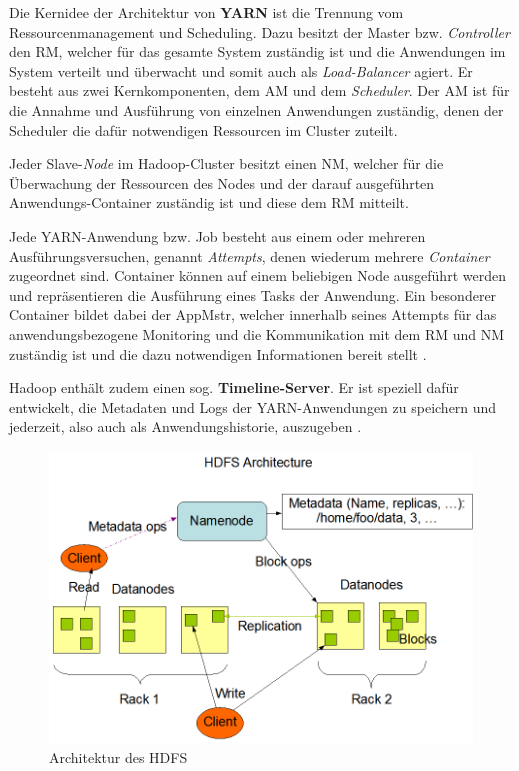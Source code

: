 Die Kernidee der Architektur von \textbf{YARN} ist die Trennung vom Ressourcenmanagement und Scheduling. Dazu besitzt der Master bzw. \emph{Controller} den \ac{RM}, welcher für das gesamte System zuständig ist und die Anwendungen im System verteilt und überwacht und somit auch als \emph{Load-Balancer} agiert. Er besteht aus zwei Kernkomponenten, dem \ac{AM} und dem \emph{Scheduler}. Der \ac{AM} ist für die Annahme und Ausführung von einzelnen Anwendungen zuständig, denen der Scheduler die dafür notwendigen Ressourcen im Cluster zuteilt.

Jeder Slave-\emph{Node} im Hadoop-Cluster besitzt einen \ac{NM}, welcher für die Überwachung der Ressourcen des Nodes und der darauf ausgeführten Anwendungs-Container zuständig ist und diese dem \ac{RM} mitteilt.

Jede YARN-Anwendung bzw. Job besteht aus einem oder mehreren Ausführungsversuchen, genannt \emph{Attempts}, denen wiederum mehrere \emph{Container} zugeordnet sind. Container können auf einem beliebigen Node ausgeführt werden und repräsentieren die Ausführung eines Tasks der Anwendung. Ein besonderer Container bildet dabei der \ac{AppMstr}, welcher innerhalb seines Attempts für das anwendungsbezogene Monitoring und die Kommunikation mit dem \ac{RM} und \ac{NM} zuständig ist und die dazu notwendigen Informationen bereit stellt \cite{HadoopYarnArch271}.

Hadoop enthält zudem einen sog. \textbf{Timeline-Server}. Er ist speziell dafür entwickelt, die Metadaten und Logs der YARN-Anwendungen zu speichern und jederzeit, also auch als Anwendungshistorie, auszugeben \cite{HadoopYarnTlServer271}.

\begin{figure}
    \centering
    \includegraphics[width=.8\columnwidth]{./images/hdfsarchitecture.png}
    \caption[Architektur des HDFS]{Architektur des HDFS \cite{HadoopHdfsDesc271}}
    \label{fig:hdfsarch}
\end{figure}


